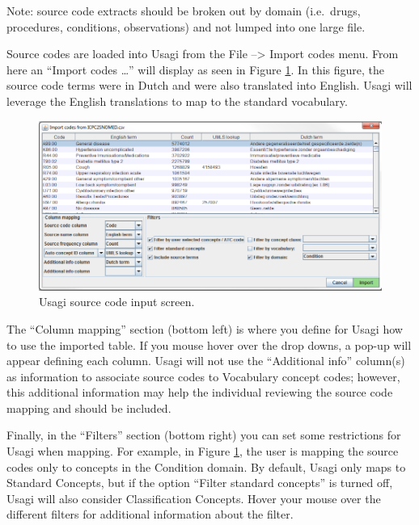 \documentclass[11pt]{book}
\theoremstyle{definition}
\theoremstyle{definition}
\theoremstyle{definition}
\theoremstyle{remark}
\begin{document}
Note: source code extracts should be broken out by domain (i.e.~drugs,
procedures, conditions, observations) and not lumped into one large
file.

Source codes are loaded into Usagi from the File --\textgreater{} Import
codes menu. From here an ``Import codes \ldots{}'' will display as seen
in Figure \ref{fig:usagiImport}. In this figure, the source code terms
were in Dutch and were also translated into English. Usagi will leverage
the English translations to map to the standard vocabulary.

\begin{figure}

{\centering \includegraphics[width=1\linewidth]{images/ExtractTransformLoad/usagiImport} 

}

\caption{Usagi source code input screen.}\label{fig:usagiImport}
\end{figure}

The ``Column mapping'' section (bottom left) is where you define for
Usagi how to use the imported table. If you mouse hover over the drop
downs, a pop-up will appear defining each column. Usagi will not use the
``Additional info'' column(s) as information to associate source codes
to Vocabulary concept codes; however, this additional information may
help the individual reviewing the source code mapping and should be
included.

Finally, in the ``Filters'' section (bottom right) you can set some
restrictions for Usagi when mapping. For example, in Figure
\ref{fig:usagiImport}, the user is mapping the source codes only to
concepts in the Condition domain. By default, Usagi only maps to
Standard Concepts, but if the option ``Filter standard concepts'' is
turned off, Usagi will also consider Classification Concepts. Hover your
mouse over the different filters for additional information about the
filter.
\end{document}
